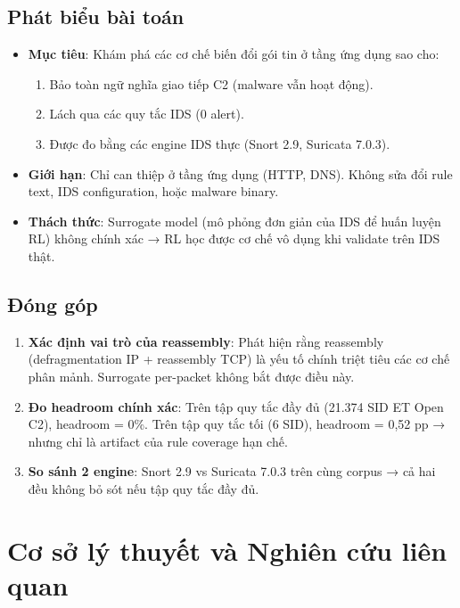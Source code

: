 \documentclass[12pt, a4paper, openany]{book}
\begin{document}
\section{Phát biểu bài toán}

\begin{itemize}
    \item \textbf{Mục tiêu}: Khám phá các cơ chế biến đổi gói tin ở tầng ứng dụng sao cho:
    \begin{enumerate}
        \item Bảo toàn ngữ nghĩa giao tiếp C2 (malware vẫn hoạt động).
        \item Lách qua các quy tắc IDS (0 alert).
        \item Được đo bằng các engine IDS thực (Snort 2.9, Suricata 7.0.3).
    \end{enumerate}
    
    \item \textbf{Giới hạn}: Chỉ can thiệp ở tầng ứng dụng (HTTP, DNS). Không sửa đổi rule text, IDS configuration, hoặc malware binary.
    
    \item \textbf{Thách thức}: Surrogate model (mô phỏng đơn giản của IDS để huấn luyện RL) không chính xác → RL học được cơ chế vô dụng khi validate trên IDS thật.
\end{itemize}

\section{Đóng góp}

\begin{enumerate}
    \item \textbf{Xác định vai trò của reassembly}: Phát hiện rằng reassembly (defragmentation IP + reassembly TCP) là yếu tố chính triệt tiêu các cơ chế phân mảnh. Surrogate per-packet không bắt được điều này.
    
    \item \textbf{Đo headroom chính xác}: Trên tập quy tắc đầy đủ (21.374 SID ET Open C2), headroom = 0\%. Trên tập quy tắc tối (6 SID), headroom = 0,52 pp → nhưng chỉ là artifact của rule coverage hạn chế.
    
    \item \textbf{So sánh 2 engine}: Snort 2.9 vs Suricata 7.0.3 trên cùng corpus → cả hai đều không bỏ sót nếu tập quy tắc đầy đủ.
\end{enumerate}

\chapter{Cơ sở lý thuyết và Nghiên cứu liên quan}
\end{document}
